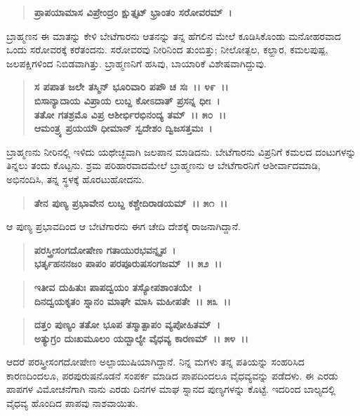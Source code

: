 \begin{verse}
\textbf{ಪ್ರಾಪಯಾಮಾಸ ವಿಪ್ರೇಂದ್ರಂ ಕ್ಷುತ್ತೃಟ್ ಭ್ರಾಂತಂ ಸರೋವರಮ್~।}
\end{verse}

ಬ್ರಾಹ್ಮಣನ ಈ ಮಾತನ್ನು ಕೇಳಿ ಬೇಟೆಗಾರನು ಆತನನ್ನು ತನ್ನ ಹೆಗಲಿನ ಮೇಲೆ ಕೂಡಿಸಿಕೊಂಡು ಮನೋಹರವಾದ ಒಂದು ಸರೋವರಕ್ಕೆ ಕರೆತಂದನು. ಸರೋವರವು ನೀರಿನಿಂದ ತುಂಬಿತ್ತು; ನೀಲೋತ್ಪಲ, ಕಲ್ಹಾರ, ಕಮಲಪುಷ್ಪ, ಜಲಪಕ್ಷಿಗಳಿಂದ ನಿಬಿಡವಾಗಿತ್ತು. ಬ್ರಾಹ್ಮಣನಿಗೆ ಹಸಿವು, ಬಾಯಾರಿಕೆ ವಿಶೇಷವಾಗಿದ್ದುವು.

\begin{verse}
\textbf{ಸ ಪಪಾತ ಜಲೇ ತಸ್ಮಿನ್ ಭೂರಿವಾರಿ ಪಪೌ ಚ ಸಃ~।। ೪೯~।।} \\\textbf{ಬಿಸಾನ್ಯಾದಾಯ ವಿಪ್ರಾಯ ಲುಬ್ದ ಕೋಽದಾತ್ ಪ್ರಸನ್ನ ಧೀಃ~।}\\\textbf{ತತೋ ಗತಶ್ರಮೊ ವಿಪ್ರ ಆಶೀರ್ಭಿರಭಿನಂದ್ಯ ತಮ್~।। ೫೦~।। }\\\textbf{ಆಮಂತ್ರ್ಯ ಪ್ರಯಯೌ ಧೀಮಾನ್ ಸ್ವದೇಶಂ ದ್ವಿಜಸತ್ತಮಃ~।}
\end{verse}

ಬ್ರಾಹ್ಮಣನು ನೀರಿನಲ್ಲಿ ಇಳಿದು ಯಥೇಚ್ಛವಾಗಿ ಜಲಪಾನ ಮಾಡಿದನು. ಬೇಟೆಗಾರನು ವಿಪ್ರನಿಗೆ ಕಮಲದ ದಂಟುಗಳನ್ನು ತಿನ್ನಲು ತಂದು ಕೊಟ್ಟನು. ಶ್ರಮ ಪರಿಹಾರವಾದಮೇಲೆ ಬ್ರಾಹ್ಮಣನು ಆ ಬೇಟೆಗಾರನಿಗೆ ಆಶೀರ್ವಾದಮಾಡಿ, ಅಭಿನಂದಿಸಿ, ತನ್ನ ಸ್ಥಳಕ್ಕೆ ಹೊರಟು\-ಹೋದನು.

\begin{verse}
\textbf{ತೇನ ಪುಣ್ಯ ಪ್ರಭಾವೇನ ಲುಬ್ದ ಕಶ್ಚೇದಿರಾಡಯಮ್~।। ೫೧~।।}
\end{verse}

ಆ ಪುಣ್ಯ ಪ್ರಭಾವದಿಂದ ಆ ಬೇಟೆಗಾರನು ಈಗ ಚೇದಿ ದೇಶಕ್ಕೆ ರಾಜನಾಗಿದ್ದಾನೆ.

\begin{verse}
\textbf{ಪರಸ್ತ್ರೀಸಂಗದೋಷೇಣ ಗತಾಯುರಭವನ್ನೃಪ~।}\\\textbf{ಭರ್ತೃಹನನಜಂ ಪಾಪಂ ಪರಪೂರುಷಸಂಗಜಮ್~।। ೫೨~।। }
\end{verse}

\begin{verse}
\textbf{ಇತೀವ ದುಹಿತುಃ ಪಾಪದ್ವಯಂ ತಸ್ಯೋಪಶಾಂತಯೇ~।}\\\textbf{ದಿನದ್ವಯಕೃತಂ ಸ್ನಾನಂ ಮಾಘೇ ಮಾಸಿ ಮಹೀಪತೇ~।। ೫೩~।। }
\end{verse}

\begin{verse}
\textbf{ದತ್ತಂ ಪುಣ್ಯಂ ತತೋ ಭೂಪ ತಸ್ಮಾತ್ಪಾಪಂ ವ್ಯಪೋಹಿತಮ್~।}\\\textbf{ಅತ್ಯುಗ್ರಂ ದುಃಖಮೂಲಂ ಯದ್ಬಾಲ್ಯೇ ವೈಧವ್ಯ ಕಾರಣಮ್~।। ೫೪~।।}
\end{verse}

ಆದರೆ ಪರಸ್ತ್ರೀಸಂಗದೋಷೇಣ ಅಲ್ಪಾಯುಷಿಯಾಗಿದ್ದಾನೆ. ನಿನ್ನ ಮಗಳು ತನ್ನ ಪತಿಯನ್ನು ಸಂಹರಿಸಿದ ಕಾರಣದಿಂದಲೂ, ಪರಪುರುಷನೊಡನೆ ಸಂಪರ್ಕ ಮಾಡಿದ ಪಾಪದಿಂದಲೂ ವೈಧವ್ಯವನ್ನು ಪಡೆದಳು. ಈ ಎರಡು ಪಾಪಗಳ ವಿಮೋಚನೆಗಾಗಿ ನಾನು ಎರಡು ದಿನಗಳ ಮಾಘ ಸ್ನಾನದ ಪುಣ್ಯಗಳನ್ನು ಕೊಟ್ಟೆ. ಇದರಿಂದ ಬಾಲ್ಯದಲ್ಲಿ ವೈಧವ್ಯ ಹೊಂದಿದ ಪಾಪವು ನಾಶವಾಯಿತು.


